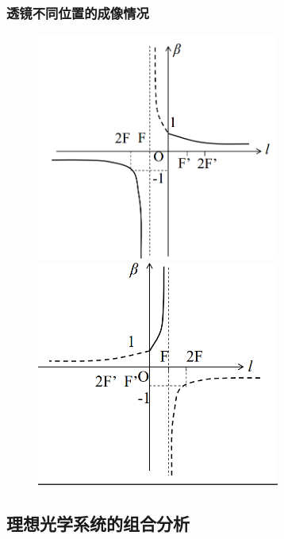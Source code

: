 \subsubsection{透镜不同位置的成像情况}
        \begin{figure}[H]
            \centering
            \includegraphics[width=8cm]{img/3.6.png}
            \includegraphics[width=8cm]{img/3.7.png}
            \end{figure} 
\subsection{理想光学系统的组合分析}
